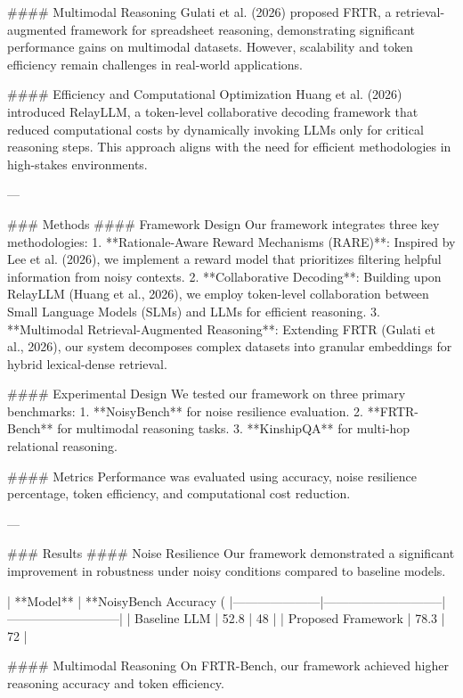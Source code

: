#### Multimodal Reasoning  
Gulati et al. (2026) proposed FRTR, a retrieval-augmented framework for spreadsheet reasoning, demonstrating significant performance gains on multimodal datasets. However, scalability and token efficiency remain challenges in real-world applications.  

#### Efficiency and Computational Optimization  
Huang et al. (2026) introduced RelayLLM, a token-level collaborative decoding framework that reduced computational costs by dynamically invoking LLMs only for critical reasoning steps. This approach aligns with the need for efficient methodologies in high-stakes environments.  

---

### Methods  
#### Framework Design  
Our framework integrates three key methodologies:  
1. **Rationale-Aware Reward Mechanisms (RARE)**: Inspired by Lee et al. (2026), we implement a reward model that prioritizes filtering helpful information from noisy contexts.  
2. **Collaborative Decoding**: Building upon RelayLLM (Huang et al., 2026), we employ token-level collaboration between Small Language Models (SLMs) and LLMs for efficient reasoning.  
3. **Multimodal Retrieval-Augmented Reasoning**: Extending FRTR (Gulati et al., 2026), our system decomposes complex datasets into granular embeddings for hybrid lexical-dense retrieval.  

#### Experimental Design  
We tested our framework on three primary benchmarks:  
1. **NoisyBench** for noise resilience evaluation.  
2. **FRTR-Bench** for multimodal reasoning tasks.  
3. **KinshipQA** for multi-hop relational reasoning.  

#### Metrics  
Performance was evaluated using accuracy, noise resilience percentage, token efficiency, and computational cost reduction.  

---

### Results  
#### Noise Resilience  
Our framework demonstrated a significant improvement in robustness under noisy conditions compared to baseline models.  

| **Model**          | **NoisyBench Accuracy (%
|---------------------|-----------------------------|---------------------------|  
| Baseline LLM        | 52.8                        | 48                        |  
| Proposed Framework  | 78.3                        | 72                        |  

#### Multimodal Reasoning  
On FRTR-Bench, our framework achieved higher reasoning accuracy and token efficiency.  

